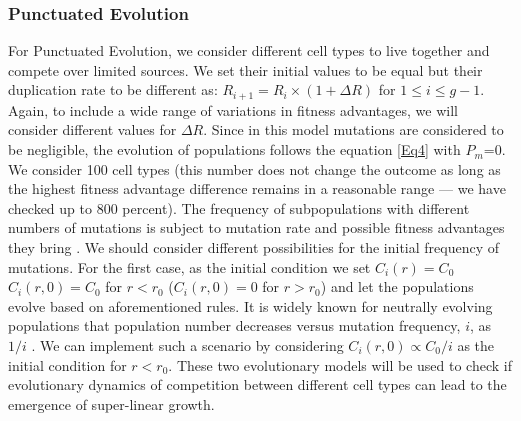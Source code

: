 \documentclass[aps,prl, superscriptaddress,groupedaddress]{revtex4}  %
\begin{document}
	\subsubsection{Punctuated Evolution}
	For Punctuated Evolution, we consider different cell types to live together and compete over limited sources. We set their initial values to be equal but their duplication rate to be different as: $R_{i+1}=R_{i} \times (1+\Delta R)$ for $1\leq i \leq g-1$.  Again, to include a wide range of variations in fitness advantages, we will consider different values for $\Delta R$.  Since in this model mutations are considered to be negligible, the evolution of populations follows the equation \ref{Eq4} with $P_m$=0.  We consider 100 cell types (this number does not change the outcome as long as the highest fitness advantage difference remains in a reasonable range --- we have checked up to 800 percent). The frequency of subpopulations with different numbers of mutations is subject to mutation rate and possible fitness advantages they bring \cite{turajlic2019resolving, hausser2020tumour}. We should consider different possibilities for the initial frequency of mutations. For the first case, as the initial condition we set $C_i(r)=C_0$ $C_i(r, 0) =C_0$ for $r<r_0$ ($C_i(r, 0)=0$ for $r>r_0$)  and let the populations evolve based on aforementioned rules. It is widely known for neutrally evolving populations that population number decreases versus mutation frequency, $i$,  as  $1/i$ \cite{williams2016identification}. We can implement such a scenario by considering $C_i (r,0) \propto C_0/i$ as the initial condition for $r<r_0$. These two evolutionary models will be used to check if evolutionary dynamics of competition between different cell types can lead to the emergence of super-linear growth. 
	
\end{document}
